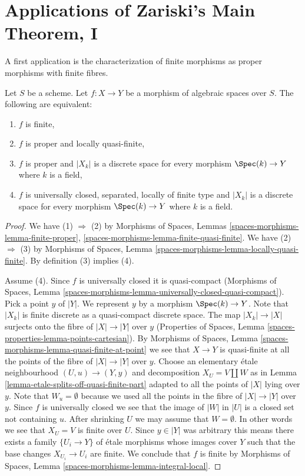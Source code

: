 \section{Applications of Zariski's Main Theorem, I}
\label{section-applications-zmt}

\noindent
A first application is the characterization of finite
morphisms as proper morphisms with finite fibres.

\begin{lemma}
\label{lemma-characterize-finite}
Let $S$ be a scheme. Let $f : X \to Y$ be a morphism of algebraic spaces
over $S$. The following are equivalent:
\begin{enumerate}
\item $f$ is finite,
\item $f$ is proper and locally quasi-finite,
\item $f$ is proper and $|X_k|$ is a discrete space for every morphism
$\Spec(k) \to Y$ where $k$ is a field,
\item $f$ is universally closed, separated, locally of finite type
and $|X_k|$ is a discrete space for every morphism $\Spec(k) \to Y$
where $k$ is a field.
\end{enumerate}
\end{lemma}

\begin{proof}
We have (1) $\Rightarrow$ (2) by
Morphisms of Spaces, Lemmas \ref{spaces-morphisms-lemma-finite-proper},
\ref{spaces-morphisms-lemma-finite-quasi-finite}.
We have (2) $\Rightarrow$ (3) by
Morphisms of Spaces, Lemma
\ref{spaces-morphisms-lemma-locally-quasi-finite}.
By definition (3) implies (4).

\medskip\noindent
Assume (4). Since $f$ is universally closed it is quasi-compact
(Morphisms of Spaces, Lemma
\ref{spaces-morphisms-lemma-universally-closed-quasi-compact}).
Pick a point $y$ of $|Y|$. We represent $y$ by a
morphism $\Spec(k) \to Y$. Note that $|X_k|$ is finite discrete
as a quasi-compact discrete space. The map $|X_k| \to |X|$ surjects
onto the fibre of $|X| \to |Y|$ over $y$
(Properties of Spaces, Lemma \ref{spaces-properties-lemma-points-cartesian}).
By
Morphisms of Spaces, Lemma \ref{spaces-morphisms-lemma-quasi-finite-at-point}
we see that $X \to Y$ is quasi-finite at all the points of the fibre
of $|X| \to |Y|$ over $y$.
Choose an elementary \'etale neighbourhood $(U, u) \to (Y, y)$
and decomposition $X_U = V \amalg W$ as in
Lemma \ref{lemma-etale-splits-off-quasi-finite-part}
adapted to all the points of $|X|$ lying over $y$.
Note that $W_u = \emptyset$ because we used all the points
in the fibre of $|X| \to |Y|$ over $y$.
Since $f$ is universally closed we see that
the image of $|W|$ in $|U|$ is a closed set not containing $u$.
After shrinking $U$ we may assume that $W = \emptyset$.
In other words we see that $X_U = V$ is finite over $U$.
Since $y \in |Y|$ was arbitrary
this means there exists a family $\{U_i \to Y\}$
of \'etale morphisms whose images cover $Y$ such that
the base changes $X_{U_i} \to U_i$ are finite.
We conclude that $f$ is finite by
Morphisms of Spaces, Lemma \ref{spaces-morphisms-lemma-integral-local}.
\end{proof}

